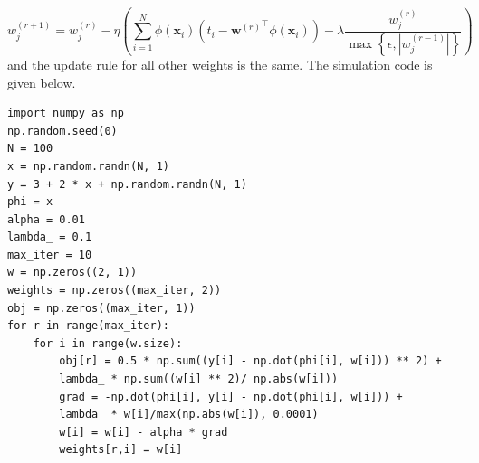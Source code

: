 \documentclass{article}
\begin{document}
\begin{enumerate}
\begin{sol}
\begin{equation}
        w_j^{(r+1)} = w_j^{(r)} - \eta \left(\sum_{i=1}^{N} \phi(\mathbf{x}_i)\left(t_i - {\mathbf{w}^{(r)}}^\top \phi(\mathbf{x}_i)\right) - \lambda \frac{w_j^{(r)}}{\max \left\{\epsilon, |w_j^{(r-1)}|\right\}}\right)
    \end{equation}
    and the update rule for all other weights is the same.
    The simulation code is given below.
    \begin{lstlisting}
import numpy as np
np.random.seed(0)
N = 100
x = np.random.randn(N, 1)
y = 3 + 2 * x + np.random.randn(N, 1)
phi = x
alpha = 0.01
lambda_ = 0.1
max_iter = 10
w = np.zeros((2, 1))
weights = np.zeros((max_iter, 2))
obj = np.zeros((max_iter, 1))
for r in range(max_iter):
    for i in range(w.size):
        obj[r] = 0.5 * np.sum((y[i] - np.dot(phi[i], w[i])) ** 2) + 
        lambda_ * np.sum((w[i] ** 2)/ np.abs(w[i]))
        grad = -np.dot(phi[i], y[i] - np.dot(phi[i], w[i])) + 
        lambda_ * w[i]/max(np.abs(w[i]), 0.0001)
        w[i] = w[i] - alpha * grad
        weights[r,i] = w[i]
    \end{lstlisting}
    \begin{figure}[!ht]
        \centering
    \end{figure}
    \end{sol}
    \color{black}
    

\end{enumerate}
\end{document}
